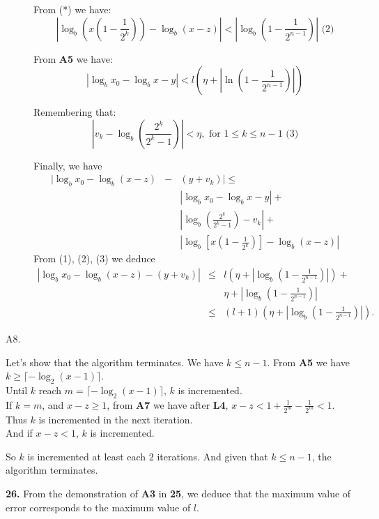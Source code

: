 \documentclass[a4paper,12pt]{article}
\newcommand{\newpar}[1]{\bigskip \noindent \textbf{#1.}}
\begin{document}
\begin{description}
From (*) we have:
\[ \left| \log_b \left(x \left(1 - \frac{1}{2^k}\right)\right) -
\log_b(x-z) \right| < \left| \log_b\left(1 - \frac{1}{2^{n-1}}
\right) \right| \mbox{ (2)}\]

From \textbf{A5} we have:
\[ |\log_bx_0 - \log_bx - y| < l \left(\eta +
\left|\ln \left(1 - \frac{1}{2^{n-1}}\right) \right| \right) \]

Remembering that:
\[ \left|v_k - \log_b\left(\frac{2^k}{2^k-1}\right) \right| < \eta, 
\mbox{ for } 1 \le k \le n-1 \mbox{ (3)}\]

Finally, we have
\begin{eqnarray*}
|\log_bx_0 - \log_b(x-z) & - & (y+v_k)|  \le \\ &&
|\log_bx_0 - \log_bx - y| +\\ &&
\left|\log_b\left(\frac{2^k}{2^k-1}\right)-v_k\right|+\\&&
\left|\log_b\left[x \left(1 - \frac{1}{2^k}\right) \right] - \log_b(x-z)
\right|
\end{eqnarray*}
From (1), (2), (3) we deduce
\begin{eqnarray*}
|\log_bx_0 - \log_b(x-z) - (y+v_k)|  & \le &
l\left(\eta + \left|\log_b\left(1 - \frac{1}{2^{n-1}}\right)\right|\right)+\\&&
\eta + \left|\log_b\left(1 - \frac{1}{2^{n-1}}\right)\right|\\& \le & 
(l+1)\left(\eta + \left|\log_b\left(1 - \frac{1}{2^{n-1}}\right)\right|\right).
\end{eqnarray*}

\item[A8.]
\end{description}

Let's show that the algorithm terminates.  We have $k \le n-1$. From \textbf{A5}
we have $k \ge \lceil -\log_2(x-1)\rceil$.\\
Until $k$ reach $m = \lceil -\log_2(x-1)\rceil$, $k$ is incremented.\\
If $k = m$, and $x-z \ge 1$, from \textbf{A7} we have after \textbf{L4},
$x-z < 1 + \frac{1}{2^m} - \frac{1}{2^m} <1$.  Thus $k$ is incremented in 
the next iteration.\\
And if $x-z<1$, $k$ is incremented.

So $k$ is incremented at least each $2$ iterations.  And given that
$k \le n-1$, the algorithm terminates.

\newpar{26} From the demonstration of \textbf{A3} in \textbf{25}, we deduce
that the maximum value of error corresponds to the maximum value of $l$.
\end{document}

